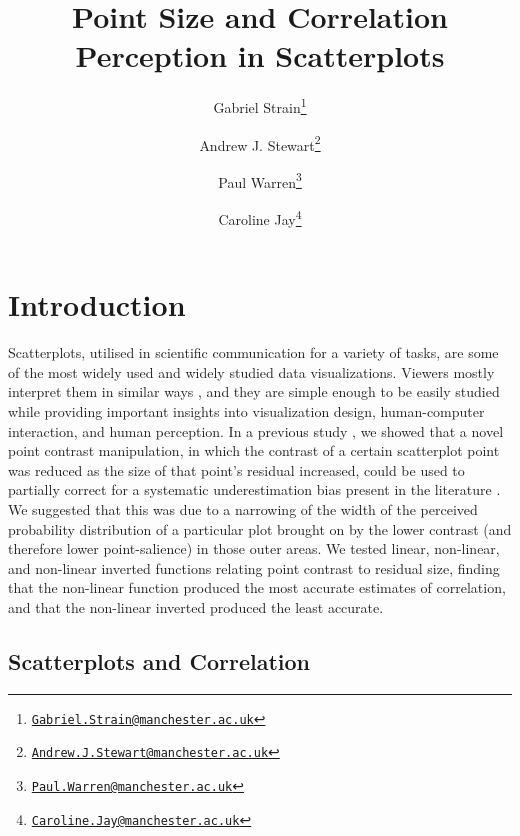 \documentclass{vgtc}                          %
\title{Point Size and Correlation Perception in Scatterplots}
\author{Gabriel Strain\thanks{\href{mailto:Gabriel.Strain@manchester.ac.uk}{\nolinkurl{Gabriel.Strain@manchester.ac.uk}}} %
\and Andrew J. Stewart\thanks{\href{mailto:Andrew.J.Stewart@manchester.ac.uk}{\nolinkurl{Andrew.J.Stewart@manchester.ac.uk}}} %
\and Paul Warren\thanks{\href{mailto:Paul.Warren@manchester.ac.uk}{\nolinkurl{Paul.Warren@manchester.ac.uk}}} %
\and Caroline Jay\thanks{\href{mailto:Caroline.Jay@manchester.ac.uk}{\nolinkurl{Caroline.Jay@manchester.ac.uk}}}} %
\affiliation{\scriptsize The University of Manchester}
\begin{document}

\firstsection{}

\maketitle

\hypertarget{introduction}{%
\section{Introduction}\label{introduction}}

Scatterplots, utilised in scientific communication for a variety of tasks,
are some of the most widely used and widely studied data visualizations. Viewers
mostly interpret them in similar ways \cite{kay_heer_2015}, and they are simple
enough to be easily studied while providing important insights into visualization
design, human-computer interaction, and human perception. In a previous study \cite{strain_2023},
we showed that a novel point contrast manipulation, in which the contrast of a certain
scatterplot point was reduced as the size of that point's residual increased, could be
used to partially correct for a systematic underestimation bias present in the
literature \cite{strahan_1978, bobko_1979, cleveland_1984, lane_1985, lauer_1989, 
collyer_1990, meyer_1992}. We suggested that this was due to a narrowing of the width
of the perceived probability distribution of a particular plot brought
on by the lower contrast (and therefore lower point-salience) in those outer
areas. We tested linear, non-linear, and non-linear inverted functions relating
point contrast to residual size, finding that the non-linear function produced
the most accurate estimates of correlation, and that the non-linear inverted produced
the least accurate.

\hypertarget{scatterplots-and-correlation}{%
\subsection{Scatterplots and Correlation}\label{scatterplots-and-correlation}}
\end{document}
